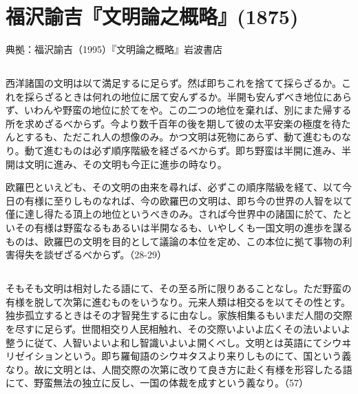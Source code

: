 \section{福沢諭吉『文明論之概略』(1875)}




典拠：福沢諭吉（1995）『文明論之概略』岩波書店

\subsection{}


西洋諸国の文明は以て満足するに足らず。然ば即ちこれを捨てて採らざるか。これを採らざるときは何れの地位に居て安んずるか。半開も安んずべき地位にあらず、いわんや野蛮の地位に於てをや。この二つの地位を棄れば、別にまた帰する所を求めざるべからず。今より数千百年の後を期して彼の太平安楽の極度を待たんとするも、ただこれ人の想像のみ。かつ文明は死物にあらず、動て進むものなり。動て進むものは必ず順序階級を経ざるべからず。即ち野蛮は半開に進み、半開は文明に進み、その文明も今正に進歩の時なり。

欧羅巴といえども、その文明の由来を尋れば、必ずこの順序階級を経て、以て今日の有様に至りしものなれば、今の欧羅巴の文明は、即ち今の世界の人智を以て僅に達し得たる頂上の地位というべきのみ。されば今世界中の諸国に於て、たといその有様は野蛮なるもあるいは半開なるも、いやしくも一国文明の進歩を謀るものは、欧羅巴の文明を目的として議論の本位を定め、この本位に拠て事物の利害得失を談ぜざるべからず。（28-29）

\subsection{}




そもそも文明は相対したる語にて、その至る所に限りあることなし。ただ野蛮の有様を脱して次第に進むものをいうなり。元来人類は相交るを以てその性とす。独歩孤立するときはその才智発生するに由なし。家族相集るもいまだ人間の交際を尽すに足らず。世間相交り人民相触れ、その交際いよいよ広くその法いよいよ整うに従て、人智いよいよ和し智識いよいよ開くべし。文明とは英語にてシウヰリゼイションという。即ち羅甸語のシウヰタスより来りしものにて、国という義なり。故に文明とは、人間交際の次第に改りて良き方に赴く有様を形容したる語にて、野蛮無法の独立に反し、一国の体裁を成すという義なり。（57）

\subsection{}





